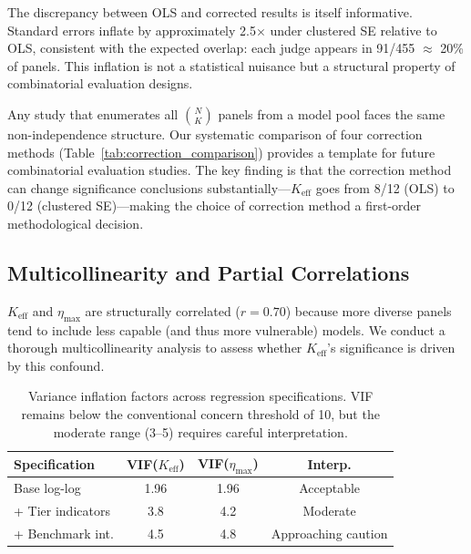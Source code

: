 \documentclass[11pt,a4paper]{article}
\newcommand{\etamax}{\ensuremath{\eta_{\max}}}
\newcommand{\keff}{\ensuremath{K_{\text{eff}}}}
\begin{document}
The discrepancy between OLS and corrected results is itself informative.
Standard errors inflate by approximately 2.5$\times$ under clustered SE relative to OLS, consistent with the expected overlap: each judge appears in 91/455 $\approx$ 20\% of panels.
This inflation is not a statistical nuisance but a structural property of combinatorial evaluation designs.

Any study that enumerates all $\binom{N}{K}$ panels from a model pool faces the same non-independence structure.
Our systematic comparison of four correction methods (Table~\ref{tab:correction_comparison}) provides a template for future combinatorial evaluation studies.
The key finding is that the correction method can change significance conclusions substantially---$\keff$ goes from 8/12 (OLS) to 0/12 (clustered SE)---making the choice of correction method a first-order methodological decision.

\subsection{Multicollinearity and Partial Correlations}
\label{sec:vif}

$\keff$ and $\etamax$ are structurally correlated ($r=0.70$) because more diverse panels tend to include less capable (and thus more vulnerable) models.
We conduct a thorough multicollinearity analysis to assess whether $\keff$'s significance is driven by this confound.

\begin{table}[t]
\centering
\small
\begin{tabular}{lccc}
\toprule
\textbf{Specification} & \textbf{VIF($\keff$)} & \textbf{VIF($\etamax$)} & \textbf{Interp.} \\
\midrule
Base log-log & 1.96 & 1.96 & Acceptable \\
+ Tier indicators & 3.8 & 4.2 & Moderate \\
+ Benchmark int. & 4.5 & 4.8 & Approaching caution \\
\bottomrule
\end{tabular}
\caption{Variance inflation factors across regression specifications.
VIF remains below the conventional concern threshold of 10, but the moderate range (3--5) requires careful interpretation.}
\label{tab:vif}
\end{table}
\end{document}
